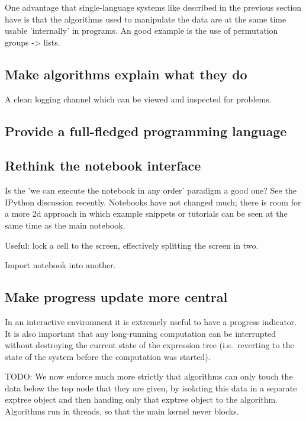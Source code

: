 \documentclass[11pt]{article}
\begin{document}
One advantage that single-language systems like described in the
previous section have is that the algorithms used to manipulate the
data are at the same time usable 'internally' in programs. An good
example is the use of permutation groups -> lists.

\subsection{Make algorithms explain what they do}

A clean logging channel which can be viewed and inspected for problems.


\subsection{Provide a full-fledged programming language}



\subsection{Rethink the notebook interface}

Is the 'we can execute the notebook in any order' paradigm a good one?
See the IPython discussion recently. Notebooks have not changed much;
there is room for a more 2d approach in which example snippets or
tutorials can be seen at the same time as the main notebook.

Useful: lock a cell to the screen, effectively splitting the screen in
two. 

Import notebook into another. 

\subsection{Make progress update more central}

In an interactive environment it is extremely useful to have a
progress indicator. It is also important that any long-running
computation can be interrupted without destroying the current state of
the expression tree (i.e.~reverting to the state of the system before
the computation was started). 

TODO: We now enforce much more strictly that algorithms can only touch the
data below the top node that they are given, by isolating this data in
a separate exptree object and then handing only that exptree object to
the algorithm. Algorithms run in threads, so that the main kernel
never blocks.
\end{document}
